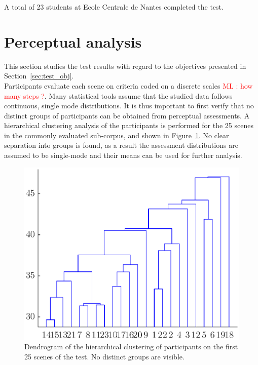 \documentclass[11pt,a4paper]{article}
\newcommand{\ml}[1]{\textcolor{red}{ML : #1}}
\begin{document}
A total of 23 students at Ecole Centrale de Nantes completed the test.

\section{Perceptual analysis}

This section studies the test results with regard to the objectives presented in Section~\ref{sec:test_obj}.\\

Participants evaluate each scene on criteria coded on a discrete scales \ml{how many steps ?}. Many statistical tools assume that the studied data follows continuous, single mode distributions. It is thus important to first verify that no distinct groups of participants can be obtained from perceptual assessments. A hierarchical clustering analysis of the participants is performed for the 25 scenes in the commonly evaluated sub-corpus, and shown in Figure~\ref{fig:hclusters}. No clear separation into groups is found, as a result the assessment distributions are assumed to be single-mode and their means can be used for further analysis.

\begin{figure}[!h]
    \centering
    \includegraphics[width=\textwidth]{figures/subj_gr.eps}
    \caption{Dendrogram of the hierarchical clustering of participants on the first 25 scenes of the test. No distinct groups are visible.}\label{fig:hclusters}
\end{figure}
\end{document}
